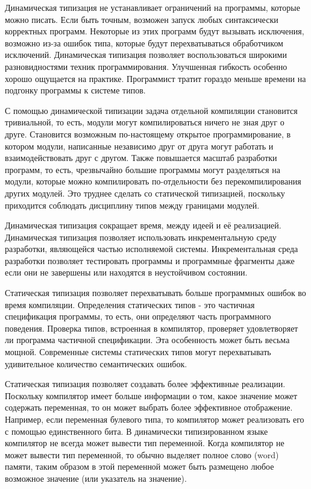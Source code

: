 Динамическая типизация не устанавливает ограничений на программы, которые можно писать. Если быть точным, возможен запуск любых синтаксически корректных программ. Некоторые из этих программ будут вызывать исключения, возможно из-за ошибок типа, которые будут перехватываться обработчиком исключений. Динамическая типизация позволяет воспользоваться широкими разновидностями техник программирования. Улучшенная гибкость особенно хорошо ощущается на практике. Программист тратит гораздо меньше времени на подгонку программы к системе типов.

С помощью динамической типизации задача отдельной компиляции становится тривиальной, то есть, модули могут компилироваться ничего не зная друг о друге. Становится возможным по-настоящему открытое программирование, в котором модули, написанные независимо друг от друга могут работать и взаимодействовать друг с другом. Также повышается масштаб разработки программ, то есть, чрезвычайно большие программы могут разделяться на модули, которые можно компилировать по-отдельности без перекомпилирования других модулей. Это труднее сделать со статической типизацией, поскольку приходится соблюдать дисциплину типов между границами модулей.

Динамическая типизация сокращает время, между идеей и её реализацией. Динамическая типизация позволяет использовать инкрементальную среду разработки, являющейся частью исполняемой системы. Инкрементальная среда разработки позволяет тестировать программы и программные фрагменты даже если они не завершены или находятся в неустойчивом состоянии.

Статическая типизация позволяет перехватывать больше программных ошибок во время компиляции. Определения статических типов - это частичная спецификация программы, то есть, они определяют часть программного поведения. Проверка типов, встроенная в компилятор, проверяет удовлетворяет ли программа частичной спецификации. Эта особенность может быть весьма мощной. Современные системы статических типов могут перехватывать удивительное количество семантических ошибок.

Статическая типизация позволяет создавать более эффективные реализации. Поскольку компилятор имеет больше информации о том, какое значение может содержать переменная, то он может выбрать более эффективное отображение. Например, если переменная булевого типа, то компилятор может реализовать его с помощью единственного бита. В динамически типизированном языке компилятор не всегда может вывести тип переменной. Когда компилятор не может вывести тип переменной, то обычно выделяет полное слово (word) памяти, таким образом в этой переменной может быть размещено любое возможное значение (или указатель на значение).


